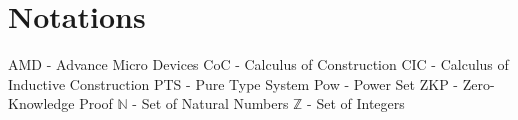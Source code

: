 \chapter*{Notations}

AMD - Advance Micro Devices
CoC  - Calculus of Construction
CIC - Calculus of Inductive Construction
PTS - Pure Type System
Pow - Power Set
ZKP - Zero-Knowledge Proof
$\mathbb{N}$ - Set of Natural Numbers
$\mathbb{Z}$ - Set of Integers
